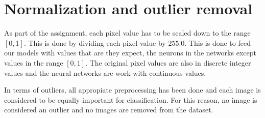 \section{Normalization and outlier removal}

As part of the assignment, each pixel value has to be scaled down to the range $[0, 1]$. This is done by dividing each pixel value by $255.0$. This is done to feed our models with values that are they expect, the neurons in the networks except values in the range $[0, 1]$. The original pixel values are also in discrete integer values and the neural networks are work with continuous values.
\par
In terms of outliers, all appropiate preprocessing has been done and each image is considered to be equally important for classification. For this reason, no image is considered an outlier and no images are removed from the dataset.